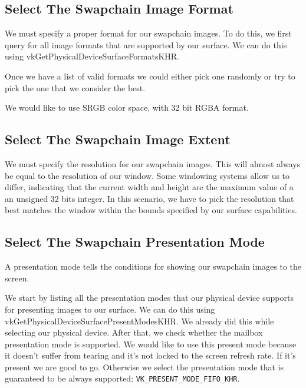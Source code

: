 \subsection{Select The Swapchain Image Format}

We must specify a proper format for our swapchain images.
To do this, we first query for all image formats that are supported by our
surface.
We can do this using vkGetPhysicalDeviceSurfaceFormatsKHR.

Once we have a list of valid formats we could either pick one randomly or
try to pick the one that we consider the best.

\begin{minipage}{\linewidth}{\noindent}
    
\end{minipage}

We would like to use SRGB color space, with 32 bit RGBA format.

\subsection{Select The Swapchain Image Extent}

We must specify the resolution for our swapchain images.
This will almost always be equal to the resolution of our window.
Some windowing systems allow us to differ, indicating that the current
width and height are the maximum value of a an unsigned 32 bits integer.
In this scenario, we have to pick the resolution that best matches the window
within the bounds specified by our surface capabilities.

\begin{minipage}{\linewidth}{\noindent}
    
\end{minipage}

\subsection{Select The Swapchain Presentation Mode}

A presentation mode tells the conditions for showing our swapchain images to
the screen.

We start by listing all the presentation modes that our physical device supports
for presenting images to our surface.
We can do this using vkGetPhysicalDeviceSurfacePresentModesKHR.
We already did this while selecting our physical device.
After that, we check whether the mailbox presentation mode is supported.
We would like to use this present mode because it doesn't suffer from
tearing and it's not locked to the screen refresh rate.
If it's present we are good to go.
Otherwise we select the presentation mode that is guaranteed to be always supported:
\texttt{VK\_PRESENT\_MODE\_FIFO\_KHR}.

